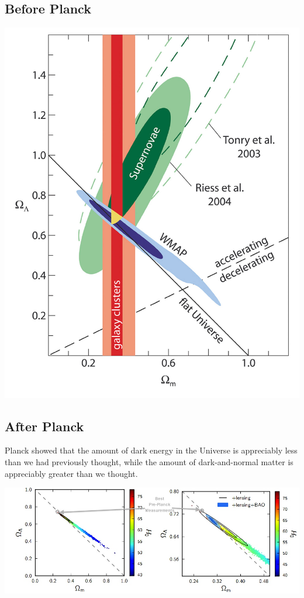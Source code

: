 \documentclass[
  letterpaper,
  DIV=11,
  numbers=noendperiod]{scrreprt}
\begin{document}
\subsection*{Before Planck}\label{before-planck}

\begin{center}
\includegraphics{images/eso0419d.jpg}
\end{center}

\subsection*{After Planck}\label{after-planck}

Planck showed that the amount of dark energy in the Universe is
appreciably less than we had previously thought, while the amount of
dark-and-normal matter is appreciably greater than we thought.

\begin{center}
\includegraphics{images/Lambda_Matter.jpg}
\end{center}
\end{document}
